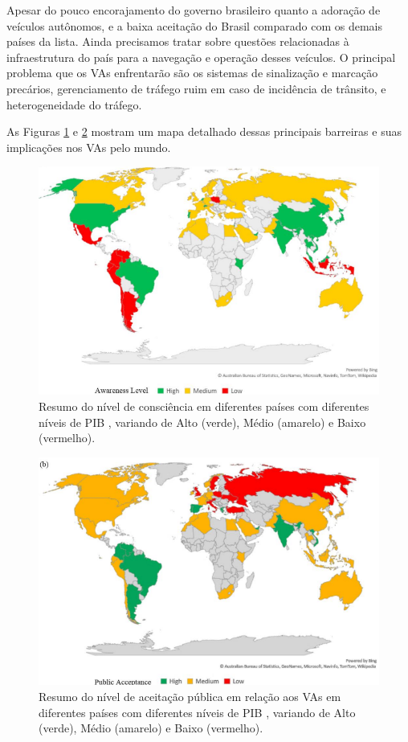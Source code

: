 Apesar do pouco encorajamento do governo brasileiro quanto a adoração de veículos autônomos, e a baixa aceitação do Brasil comparado com os demais países da lista. Ainda precisamos tratar sobre questões relacionadas à infraestrutura do país para a navegação e operação desses veículos. 
O principal problema que os VAs enfrentarão são os sistemas de sinalização e marcação precários, gerenciamento de tráfego ruim em caso de incidência de trânsito, e heterogeneidade do tráfego.

As Figuras \ref{awareness} e \ref{public} mostram um mapa detalhado dessas principais barreiras e suas implicações nos VAs pelo mundo.
\begin{figure}[H]
\centering
\includegraphics[width=12cm]{Figures/grafik-a.png}
\caption{Resumo do nível de consciência em diferentes países com diferentes níveis de PIB \cite{mundobrasil}, variando de Alto (verde), Médio (amarelo) e Baixo (vermelho).}
\label{awareness}
\end{figure}

\begin{figure}[H]
\centering
\includegraphics[width=12cm]{Figures/grafik-b.png}
\caption{Resumo do nível de aceitação pública em relação aos VAs em diferentes países com diferentes níveis de PIB \cite{mundobrasil}, variando de Alto (verde), Médio (amarelo) e Baixo (vermelho).}
\label{public}
\end{figure}

